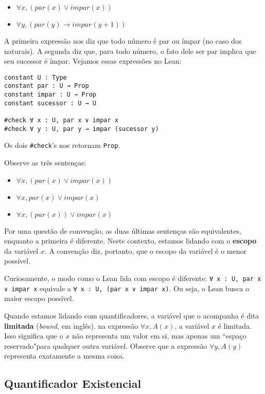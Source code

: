         \begin{itemize}
            \item $\forall x, (par(x) \lor impar(x))$
            \item $\forall y, (par(y) \rightarrow impar(y + 1))$
        \end{itemize}

        A primeira expressão nos diz que todo número é par ou ímpar (no caso dos naturais).
        A segunda diz que, para todo número, o fato dele ser par implica que seu sucessor é ímpar.
        Vejamos essas expressões no Lean:

        \begin{lstlisting}
constant U : Type
constant par : U → Prop
constant impar : U → Prop
constant sucessor : U → U

#check ∀ x : U, par x ∨ impar x
#check ∀ y : U, par y → impar (sucessor y)
\end{lstlisting}

        Os dois \lstinline{#check}'s nos retornam \lstinline{Prop}.

        Observe as três sentenças:

        \begin{itemize}
            \item $\forall x, (par(x) \lor impar(x))$
            \item $\forall x, par(x) \lor impar(x)$
            \item $\forall x, (par(x)) \lor impar(x)$
        \end{itemize}

        Por uma questão de convenção, as duas últimas sentenças são equivalentes, enquanto a primeira é diferente.
        Neste contexto, estamos lidando com o \textbf{escopo} da variável $x$. A convenção diz, portanto, que o escopo da variável é o menor possível.
        
        Curiosamente, o modo como o Lean lida com escopo é diferente: \lstinline{∀ x : U, par x ∨ impar x} equivale a \lstinline{∀ x : U, (par x ∨ impar x)}.
        Ou seja, o Lean busca o maior escopo possível.

        Quando estamos lidando com quantificadores, a variável que o acompanha é dita \textbf{limitada} (\textit{bound}, em inglês).
        na expressão $\forall x, A(x)$, a variável $x$ é limitada.
        Isso significa que o $x$ não representa um valor em si, mas apenas um ``espaço reservado"\space para qualquer outra variável.
        Observe que a expressão $\forall y, A(y)$ representa exatamente a mesma coisa.

    \subsection{Quantificador Existencial}